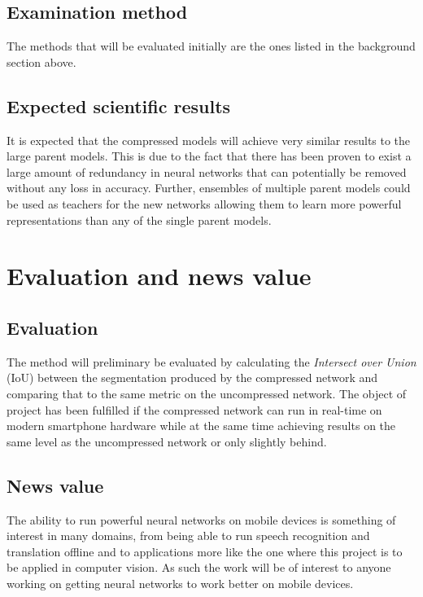 \documentclass[11pt]{article}
\begin{document}
\subsection{Examination method}
\label{sec:org46ed642}
The methods that will be evaluated initially are the ones listed in the background section above. 

\subsection{Expected scientific results}
\label{sec:orgda41476}
It is expected that the compressed models will achieve very similar results to the large parent models. This is due to the fact that there has been proven to exist a large amount of redundancy in neural networks that can potentially be removed without any loss in accuracy. Further, ensembles of multiple parent models could be used as teachers for the new networks allowing them to learn more powerful representations than any of the single parent models.
\section{Evaluation and news value}
\label{sec:org8bef66a}
\subsection{Evaluation}
\label{sec:orgbd763b1}
The method will preliminary be evaluated by calculating the \emph{Intersect over Union} (IoU) between the segmentation produced by the compressed network and comparing that to the same metric on the uncompressed network. The object of project has been fulfilled if the compressed network can run in real-time on modern smartphone hardware while at the same time achieving results on the same level as the uncompressed network or only slightly behind.

\subsection{News value}
\label{sec:orgfcce705}
The ability to run powerful neural networks on mobile devices is something of interest in many domains, from being able to run speech recognition and translation offline and to applications more like the one where this project is to be applied in computer vision. As such the work will be of interest to anyone working on getting neural networks to work better on mobile devices.
\end{document}
